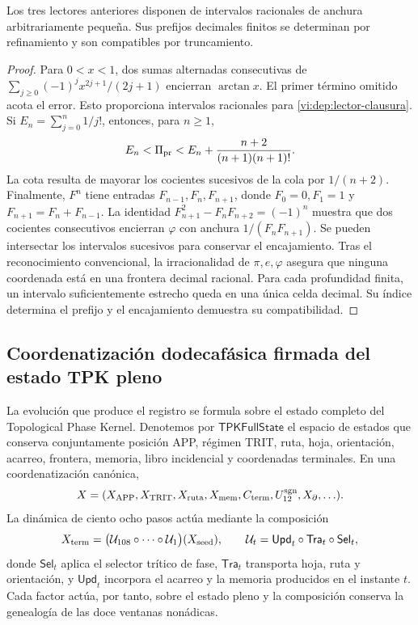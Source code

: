 \begin{proposition}
\label{vi:dep:prefijos}
Los tres lectores anteriores disponen de intervalos racionales de anchura
arbitrariamente pequeña. Sus prefijos decimales finitos se determinan por
refinamiento y son compatibles por truncamiento.
\end{proposition}
\begin{proof}
Para \(0<x<1\), dos sumas alternadas consecutivas de
\(\sum_{j\ge0}(-1)^jx^{2j+1}/(2j+1)\) encierran \(\arctan x\).
El primer término omitido acota el error. Esto proporciona intervalos
racionales para \eqref{vi:dep:lector-clausura}.
Si \(E_n=\sum_{j=0}^n1/j!\), entonces, para \(n\ge1\),
\[
 E_n<\Pi_{\rm pr}<E_n+
 \frac{n+2}{(n+1)(n+1)!}.
\]
La cota resulta de mayorar los cocientes sucesivos de la cola por
\(1/(n+2)\). Finalmente, \(F^n\) tiene entradas
\(F_{n-1},F_n,F_{n+1}\), donde \(F_0=0,F_1=1\) y
\(F_{n+1}=F_n+F_{n-1}\). La identidad
\(F_{n+1}^2-F_nF_{n+2}=(-1)^n\) muestra que dos cocientes consecutivos
encierran \(\varphi\) con anchura \(1/(F_nF_{n+1})\).
Se pueden intersectar los intervalos sucesivos para conservar el
encajamiento. Tras el reconocimiento convencional, la irracionalidad de
\(\pi,e,\varphi\) asegura que ninguna coordenada está en una frontera
decimal racional. Para cada profundidad finita, un intervalo
suficientemente estrecho queda en una única celda decimal. Su índice
determina el prefijo y el encajamiento demuestra su compatibilidad.
\end{proof}

\subsection{Coordenatización dodecafásica firmada del estado TPK pleno}
\label{vi:dep:estado-pleno}

La evolución que produce el registro se formula sobre el estado completo del
Topological Phase Kernel. Denotemos por
\(\mathsf{TPKFullState}\) el espacio de estados que conserva conjuntamente
posición APP, régimen TRIT, ruta, hoja, orientación, acarreo, frontera,
memoria, libro incidencial y coordenadas terminales. En una coordenatización canónica,
\[
 X=(X_{\rm APP},X_{\rm TRIT},X_{\rm ruta},X_{\rm mem},
       C_{\rm term},U_{12}^{\rm sgn},X_{\partial},\ldots).
\]
La dinámica de ciento ocho pasos actúa mediante la composición
\begin{equation}
 X_{\rm term}
 =\bigl(\mathcal U_{108}\circ\cdots\circ\mathcal U_1\bigr)(X_{\rm seed}),
 \qquad
 \mathcal U_t=\mathsf{Upd}_t\circ\mathsf{Tra}_t\circ\mathsf{Sel}_t,
 \label{vi:dep:estado-terminal-108}
\end{equation}
donde \(\mathsf{Sel}_t\) aplica el selector trítico de fase,
\(\mathsf{Tra}_t\) transporta hoja, ruta y orientación, y
\(\mathsf{Upd}_t\) incorpora el acarreo y la memoria producidos en el
instante \(t\). Cada factor actúa, por tanto, sobre el estado pleno y la
composición conserva la genealogía de las doce ventanas nonádicas.

